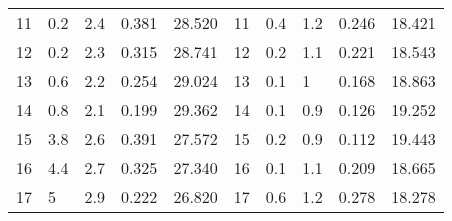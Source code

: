 \documentclass[12pt,a4paper]{article}
\begin{document}
\begin{table}[!h]
\begin{center}
\begin{tabular}{ | l | l | l | l | l | l | l | l | l | l |}
                    11 & 0.2    & 2.4       & 0.381     & 28.520    & 11 & 0.4      & 1.2       & 0.246     & 18.421  \\
                    12 & 0.2    & 2.3       & 0.315     & 28.741    & 12 & 0.2      & 1.1       & 0.221     & 18.543  \\
                    13 & 0.6    & 2.2       & 0.254     & 29.024    & 13 & 0.1      & 1         & 0.168     & 18.863  \\
                    14 & 0.8    & 2.1       & 0.199     & 29.362    & 14 & 0.1      & 0.9       & 0.126     & 19.252  \\
                    15 & 3.8    & 2.6       & 0.391     & 27.572    & 15 & 0.2      & 0.9       & 0.112     & 19.443  \\
                    16 & 4.4    & 2.7       & 0.325     & 27.340    & 16 & 0.1      & 1.1       & 0.209     & 18.665  \\
                    17 & 5      & 2.9       & 0.222     & 26.820    & 17 & 0.6      & 1.2       & 0.278     & 18.278  \\
                    \hline                
                \end{tabular}
            \end{center}
        \end{table}
        
\end{document}
